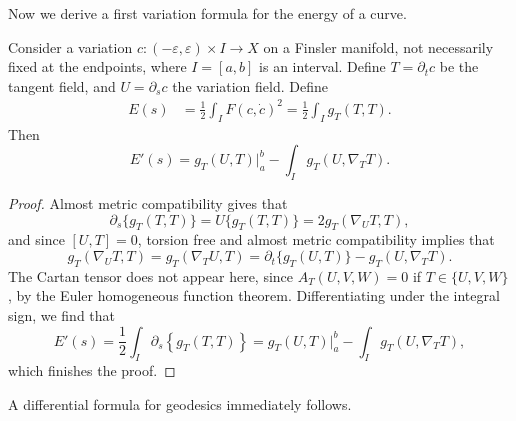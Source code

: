 Now we derive a first variation formula for the energy of a curve.

\begin{prop}
  Consider a variation $c: (-\varepsilon,\varepsilon) \times I \to X$ on a Finsler manifold, not necessarily fixed at the endpoints, where $I = [a,b]$ is an interval. Define $T = \partial_t c$ be the tangent field, and $U = \partial_s c$ the variation field. Define
  \begin{align*}
    E(s) &= \frac{1}{2} \int_I F(c,\dot{c})^2 = \frac{1}{2} \int_I g_T( T, T ).
  \end{align*}
  Then
  \[ E'(s) = g_T(U,T)|_a^b - \int_I g_T(U,\nabla_T T). \]
\end{prop}
\begin{proof}
Almost metric compatibility gives that
%
\begin{equation}
  \partial_s \{ g_T(T,T) \} = U \{ g_T(T,T) \} = 2 g_T(\nabla_U T, T),
\end{equation}
%
and since $[U,T] = 0$, torsion free and almost metric compatibility implies that
%
\begin{equation}
  g_T( \nabla_U T, T ) = g_T( \nabla_T U, T ) = \partial_t \{ g_T(U,T) \} - g_T(U, \nabla_T T).
\end{equation}
%
The Cartan tensor does not appear here, since $A_T(U,V,W) = 0$ if $T \in \{U,V,W\}$, by the Euler homogeneous function theorem. Differentiating under the integral sign, we find that
%
\begin{equation}
  E'(s) = \frac{1}{2} \int_I \partial_s \left\{ g_T(T,T) \right\} = g_T(U,T)|_a^b - \int_I g_T(U, \nabla_T T),
\end{equation}
%
which finishes the proof.
\end{proof}

A differential formula for geodesics immediately follows.

